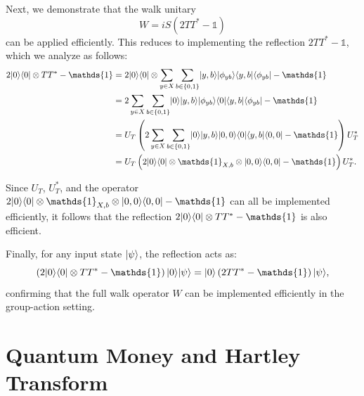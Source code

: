 \documentclass[12pt]{report}
\begin{document}
Next, we demonstrate that the walk unitary
\[
W = iS(2TT^* - \mathds{1})
\]
can be applied efficiently. This reduces to implementing the reflection \( 2TT^* - \mathds{1} \), which we analyze as follows:
\begin{align*}
2\ket{0}\bra{0} \otimes TT^* - \mathds{1}
&= 2\ket{0}\bra{0} \otimes \sum_{y \in X} \sum_{b \in \{0,1\}} \ket{y,b} \ket{\phi_{yb}} \bra{y,b} \bra{\phi_{yb}} - \mathds{1} \\
&= 2\sum_{y \in X} \sum_{b \in \{0,1\}} \ket{0} \ket{y,b} \ket{\phi_{yb}} \bra{0} \bra{y,b} \bra{\phi_{yb}} - \mathds{1} \\
&= U_T \left( 2 \sum_{y \in X} \sum_{b \in \{0,1\}} \ket{0} \ket{y,b} \ket{0,0} \bra{0} \bra{y,b} \bra{0,0} - \mathds{1} \right) U_T^* \\
&= U_T \left( 2\ket{0}\bra{0} \otimes \mathds{1}_{X,b} \otimes \ket{0,0}\bra{0,0} - \mathds{1} \right) U_T^*.
\end{align*}

Since \( U_T \), \( U_T^* \), and the operator \( 2\ket{0}\bra{0} \otimes \mathds{1}_{X,b} \otimes \ket{0,0}\bra{0,0} - \mathds{1} \) can all be implemented efficiently, it follows that the reflection \( 2\ket{0}\bra{0} \otimes TT^* - \mathds{1} \) is also efficient.

Finally, for any input state \( \lvert\psi\rangle \), the reflection acts as:
\[
\left(2\ket{0}\bra{0} \otimes TT^* - \mathds{1} \right) \ket{0} \ket{\psi} = \ket{0} \left(2TT^* - \mathds{1} \right) \ket{\psi},
\]
confirming that the full walk operator \( W \) can be implemented efficiently in the group-action setting.











\chapter{Quantum Money and Hartley Transform}\label{chap:quantum_money}
\end{document}
